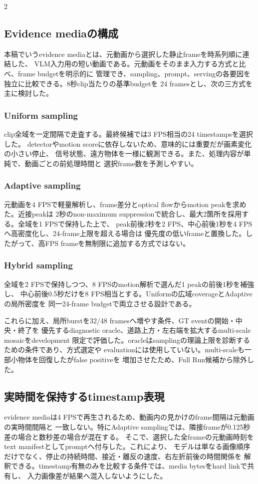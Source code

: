 \documentclass[9pt,a4paper]{extarticle}
\begin{document}
\begin{multicols}{2}
\subsection{Evidence mediaの構成}
本稿でいうevidence mediaとは、元動画から選択した静止frameを時系列順に連結した、
VLM入力用の短い動画である。元動画をそのまま入力する方式と比べ、frame budgetを明示的に
管理でき、sampling、prompt、servingの各要因を独立に比較できる。8秒clip当たりの基準budgetを
24 framesとし、次の三方式を主に検討した。

\subsubsection*{Uniform sampling}
clip全域を一定間隔で走査する。最終候補では3 FPS相当の24 timestampsを選択した。
detectorやmotion scoreに依存しないため、意味的には重要だが画素変化の小さい停止、
信号状態、遠方物体を一様に観測できる。また、処理内容が単純で、動画ごとの前処理時間と
選択frame数を予測しやすい。

\subsubsection*{Adaptive sampling}
元動画を4 FPSで軽量解析し、frame差分とoptical flowからmotion peakを求めた。近接peakは
2秒のnon-maximum suppressionで統合し、最大2箇所を採用する。全域を1 FPSで保持した上で、
peak前後2秒を2 FPS、中心前後1秒を4 FPSへ高密度化し、24-frame上限を超える場合は
優先度の低いframeと置換した。したがって、高FPS frameを無制限に追加する方式ではない。

\subsubsection*{Hybrid sampling}
全域を2 FPSで保持しつつ、8 FPSのmotion解析で選んだ1 peakの前後1秒を補強し、
中心前後0.5秒だけを8 FPS相当とする。Uniformの広域coverageとAdaptiveの局所密度を
同一24-frame budgetで両立させる設計である。

これらに加え、局所burstを32/48 framesへ増やす条件、GT eventの開始・中央・終了を
優先するdiagnostic oracle、道路上方・左右端を拡大するmulti-scale mosaicをdevelopment
限定で評価した。oracleはsamplingの理論上限を診断するための条件であり、方式選定や
evaluationには使用していない。multi-scaleも一部小物体を回復したがfalse positiveを
増加させたため、Full Run候補から除外した。

\subsection{実時間を保持するtimestamp表現}
evidence mediaは4 FPSで再生されるため、動画内の見かけのframe間隔は元動画の実時間間隔と
一致しない。特にAdaptive samplingでは、隣接frameが0.125秒差の場合と数秒差の場合が混在する。
そこで、選択した全frameの元動画時刻をtext manifestとしてpromptへ付与した。これにより、
モデルは単なる画像順序だけでなく、停止の持続時間、接近・離反の速度、右左折前後の時間関係を
解釈できる。timestamp有無のみを比較する条件では、media bytesをhard linkで共有し、
入力画像差が結果へ混入しないようにした。


\end{multicols}
\end{document}
